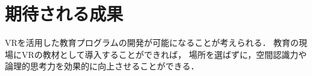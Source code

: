 \section{期待される成果}
  VRを活用した教育プログラムの開発が可能になることが考えられる．
  教育の現場にVRの教材として導入することができれば，
  場所を選ばずに，空間認識力や論理的思考力を効果的に向上させることができる．
